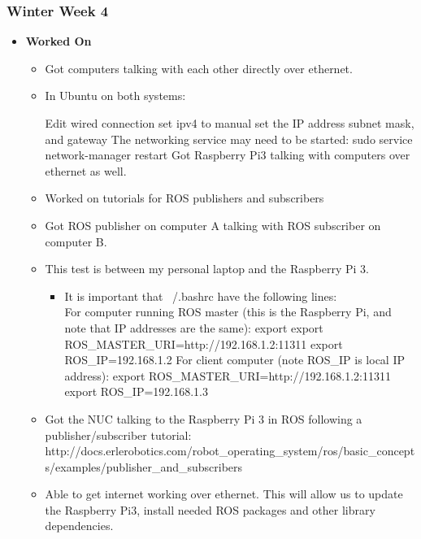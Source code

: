 \documentclass[compsoc,draftclsnofoot,onecolumn,10pt]{IEEEtran}
\begin{document}
\subsubsection{Winter Week 4}
\begin{itemize}
    \item {\textbf{Worked On}}
    \begin{itemize}
        \item Got computers talking with each other directly over ethernet.

        \item In Ubuntu on both systems:

Edit wired connection
set ipv4 to manual
set the IP address
subnet mask, and gateway
The networking service may need to be started:
sudo service network-manager restart
Got Raspberry Pi3 talking with computers over ethernet as well.

        \item Worked on tutorials for ROS publishers and subscribers

        \item Got ROS publisher on computer A talking with ROS subscriber on computer B.

        \item This test is between my personal laptop and the Raspberry Pi 3.
        \begin{itemize}
        \item It is important that ~/.bashrc have the following lines:\\
        For computer running ROS master (this is the Raspberry Pi, and note that IP addresses are the same):
        export export ROS\_MASTER\_URI=http://192.168.1.2:11311
        export ROS\_IP=192.168.1.2
        For client computer (note ROS\_IP is local IP address):
        export ROS\_MASTER\_URI=http://192.168.1.2:11311
        export ROS\_IP=192.168.1.3
        \end{itemize}
        \item Got the NUC talking to the Raspberry Pi 3 in ROS following a publisher/subscriber tutorial:\\
        http://docs.erlerobotics.com/robot\_operating\_system/ros/basic\_concepts/examples/publisher\_and\_subscribers

        \item Able to get internet working over ethernet. This will allow us to update the Raspberry Pi3, install needed ROS packages and other library dependencies.
    \end{itemize}


\end{itemize}
\end{document}
